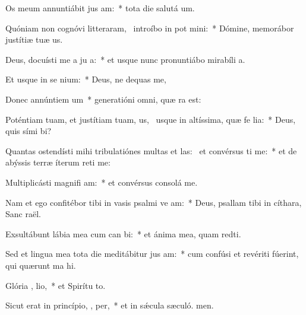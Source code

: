 \item Os meum annuntiábit jus am:~* tota die salutá um.
\item Quóniam non cognóvi litteraram,~\pscross{} introíbo in pot mini:~* Dómine, memorábor justítiæ tuæ us.
\item Deus, docuísti me a ju a:~* et usque nunc pronuntiábo mirabíli a.
\item Et usque in se  nium:~* Deus, ne dequas me,
\item Donec annúntiem  um~* generatióni omni, quæ ra est:
\item Poténtiam tuam, et justítiam tuam, us,~\pscross{} usque in altíssima, quæ fe lia:~* Deus, quis sími bi?
\item Quantas ostendísti mihi tribulatiónes multas et las:~\pscross{} et convérsus ti me:~* et de abýssis terræ íterum reti me:
\item Multiplicásti magnifi am:~* et convérsus consolá  me.
\item Nam et ego confitébor tibi in vasis psalmi ve am:~* Deus, psallam tibi in cíthara, Sanc raël.
\item Exsultábunt lábia mea cum can bi:~* et ánima mea, quam redti.
\item Sed et lingua mea tota die meditábitur jus am:~* cum confúsi et revériti fúerint, qui quærunt ma hi.
\item Glória ,  lio,~* et Spirítu to.
\item Sicut erat in princípio,  ,  per,~* et in sǽcula sæculó. men.
